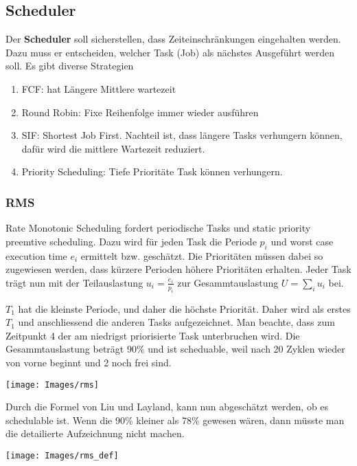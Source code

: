 \subsection{Scheduler}
Der \textbf{Scheduler} soll sicherstellen, dass Zeiteinschränkungen eingehalten werden. Dazu muss er entscheiden, welcher Task (Job) als nächstes Ausgeführt werden soll. Es gibt diverse Strategien
\begin{enumerate}
	\item FCF: hat Längere Mittlere wartezeit
	\item Round Robin: Fixe Reihenfolge immer wieder ausführen
	\item SIF: Shortest Job First. Nachteil ist, dass längere Tasks verhungern können, dafür wird die mittlere Wartezeit reduziert.
	\item Priority Scheduling: Tiefe Prioritäte Task können verhungern.
\end{enumerate}

\subsubsection{RMS}
Rate Monotonic Scheduling fordert periodische Tasks und static priority preemtive scheduling. Dazu wird für jeden Task die Periode $p_i$ und worst case execution time $e_i$ ermittelt bzw. geschätzt. Die Prioritäten müssen dabei so zugewiesen werden, dass kürzere Perioden höhere Prioritäten erhalten. Jeder Task trägt nun mit der Teilauslastung $u_i = \frac{e_i}{p_i}$ zur Gesammtauslastung $U = \sum_{i}^{}u_i$ bei.

$T_1$ hat die kleinste Periode, und daher die höchste Priorität. Daher wird als erstes $T_1$ und anschliessend die anderen Tasks aufgezeichnet. Man beachte, dass zum Zeitpunkt 4 der am niedrigst priorisierte Task unterbruchen wird. Die Gesammtauslastung beträgt $90\%$ und ist scheduable, weil nach 20 Zyklen wieder von vorne beginnt und 2 noch frei sind.
\begin{center}
	\texttt{[image: Images/rms]}
\end{center}

Durch die Formel von Liu und Layland, kann nun abgeschätzt werden, ob es schedulable ist. Wenn die 90\% kleiner als 78\% gewesen wären, dann müsste man die detailierte Aufzeichnung nicht machen.
\begin{center}
	\texttt{[image: Images/rms\_def]}
\end{center}
